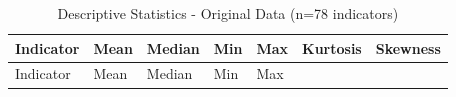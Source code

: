 \documentclass[
  letterpaper,
  DIV=11,
  numbers=noendperiod]{scrartcl}
\begin{document}
\begin{longtable}[]{@{}
  >{\raggedright\arraybackslash}p{}
  >{\raggedleft\arraybackslash}p{}
  >{\raggedleft\arraybackslash}p{}
  >{\raggedleft\arraybackslash}p{}
  >{\raggedleft\arraybackslash}p{}
  >{\raggedleft\arraybackslash}p{}
  >{\raggedleft\arraybackslash}p{}@{}}
\caption{Descriptive Statistics - Original Data (n=78
indicators)}\tabularnewline
\toprule\noalign{}
\begin{minipage}[b]{\linewidth}\raggedright
Indicator
\end{minipage} & \begin{minipage}[b]{\linewidth}\raggedleft
Mean
\end{minipage} & \begin{minipage}[b]{\linewidth}\raggedleft
Median
\end{minipage} & \begin{minipage}[b]{\linewidth}\raggedleft
Min
\end{minipage} & \begin{minipage}[b]{\linewidth}\raggedleft
Max
\end{minipage} & \begin{minipage}[b]{\linewidth}\raggedleft
Kurtosis
\end{minipage} & \begin{minipage}[b]{\linewidth}\raggedleft
Skewness
\end{minipage} \\
\midrule\noalign{}
\endfirsthead
\toprule\noalign{}
\begin{minipage}[b]{\linewidth}\raggedright
Indicator
\end{minipage} & \begin{minipage}[b]{\linewidth}\raggedleft
Mean
\end{minipage} & \begin{minipage}[b]{\linewidth}\raggedleft
Median
\end{minipage} & \begin{minipage}[b]{\linewidth}\raggedleft
Min
\end{minipage} & \begin{minipage}[b]{\linewidth}\raggedleft
Max
\end{minipage} & \begin{minipage}[b]{\linewidth}\raggedleft

\end{minipage}
\end{longtable}
\end{document}
